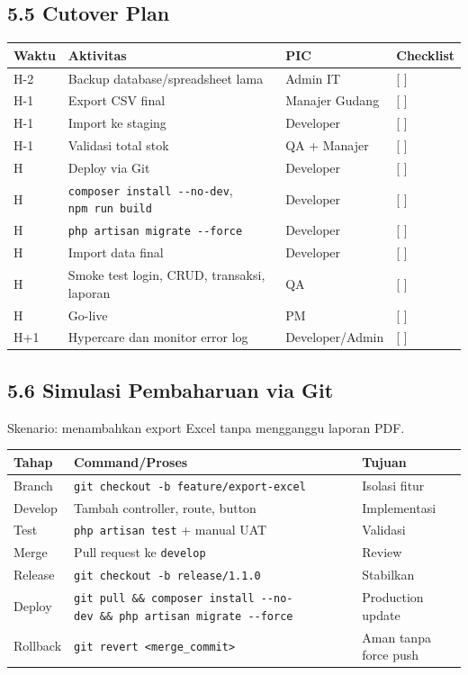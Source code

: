 \documentclass[
]{article}
\begin{document}
\subsection{5.5 Cutover Plan}\label{55-cutover-plan}

\begin{longtable}[]{@{}P{0.15\textwidth}P{0.22\textwidth}P{0.18\textwidth}P{0.39\textwidth}@{}}
\toprule\noalign{}
Waktu & Aktivitas & PIC & Checklist \\
\midrule\noalign{}
\endhead
\bottomrule\noalign{}
\endlastfoot
H-2 & Backup database/spreadsheet lama & Admin IT & {[} {]} \\
H-1 & Export CSV final & Manajer Gudang & {[} {]} \\
H-1 & Import ke staging & Developer & {[} {]} \\
H-1 & Validasi total stok & QA + Manajer & {[} {]} \\
H & Deploy via Git & Developer & {[} {]} \\
H & \texttt{composer\ install\ -\/-no-dev}, \texttt{npm\ run\ build} &
Developer & {[} {]} \\
H & \texttt{php\ artisan\ migrate\ -\/-force} & Developer & {[} {]} \\
H & Import data final & Developer & {[} {]} \\
H & Smoke test login, CRUD, transaksi, laporan & QA & {[} {]} \\
H & Go-live & PM & {[} {]} \\
H+1 & Hypercare dan monitor error log & Developer/Admin & {[} {]} \\
\end{longtable}

\subsection{5.6 Simulasi Pembaharuan via
Git}\label{56-simulasi-pembaharuan-via-git}

Skenario: menambahkan export Excel tanpa mengganggu laporan PDF.

\begin{longtable}[]{@{}P{0.20\textwidth}P{0.26\textwidth}P{0.50\textwidth}@{}}
\toprule\noalign{}
Tahap & Command/Proses & Tujuan \\
\midrule\noalign{}
\endhead
\bottomrule\noalign{}
\endlastfoot
Branch & \texttt{git\ checkout\ -b\ feature/export-excel} & Isolasi
fitur \\
Develop & Tambah controller, route, button & Implementasi \\
Test & \texttt{php\ artisan\ test} + manual UAT & Validasi \\
Merge & Pull request ke \texttt{develop} & Review \\
Release & \texttt{git\ checkout\ -b\ release/1.1.0} & Stabilkan \\
Deploy &
\texttt{git\ pull\ \&\&\ composer\ install\ -\/-no-dev\ \&\&\ php\ artisan\ migrate\ -\/-force}
& Production update \\
Rollback & \texttt{git\ revert\ \textless{}merge\_commit\textgreater{}}
& Aman tanpa force push \\
\end{longtable}
\end{document}
